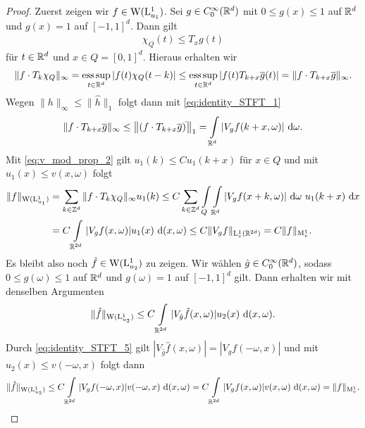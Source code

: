 \begin{proof}
	Zuerst zeigen wir $ f \in \mathrm{W}(\mathrm{L}^1_{u_1}) $.
	Sei $ g \in C^\infty_0(\mathbb{R}^d) $ mit $ 0 \leq g(x) \leq 1 $ auf $ \mathbb{R}^d $ und $ g(x) = 1  $ auf $ [-1,1]^d $. Dann gilt 
	\begin{align*}
	\chi_Q(t) \leq T_x g(t)
	\end{align*}
	für $ t \in \mathbb{R}^d $ und $ x \in Q = [0,1]^d $. 
	Hieraus erhalten wir
	\begin{align*}
	\| f \cdot T_k \chi_Q \|_\infty
	=
	\operatorname*{ess\,sup}_{t \in \mathbb{R}^d} | f(t) \chi_Q(t - k) |
	\leq 
	\operatorname*{ess\,sup}_{t \in \mathbb{R}^d} | f(t) T_{k+x} \overline{g}(t) |
	=
	\| f \cdot T_{k+x} \overline{g} \|_\infty.
	\end{align*}
	Wegen $ \| h \|_\infty \leq \| \hat{h} \|_1 $ folgt dann mit \eqref{eq:identity_STFT_1}
	\begin{align*}
	\| f \cdot T_{k+x} \overline{g} \|_\infty
	\leq
	\left\|(f \cdot T_{k+x} \overline{g})^{\hat{}} \right\|_1
	=
	\int \limits_{\mathbb{R}^d}
	| V_g f(k+x, \omega) | \text{ d} \omega.
	\end{align*}
	Mit \eqref{eq:v_mod_prop_2} gilt $ u_1(k) \leq C u_1(k+x) $ für $ x \in Q $ und mit $ u_1(x) \leq v(x,\omega) $ folgt 
	\begin{align*}
	\| f \|_{\mathrm{W}(\mathrm{L}^1_{u_1})} 
	&= 
	\sum \limits_{k \in \mathbb{Z}^d}
	\| f \cdot T_k\chi_Q \|_\infty u_1(k)
	\leq 
	C
	\sum \limits_{k \in \mathbb{Z}^d} 
	\int \limits_Q 
	\int \limits_{\mathbb{R}^d}
	| V_g f(x+ k, \omega) |  \text{ d} \omega  \ u_1(k + x) \text{ d} x\\
	&=
	C\int \limits_{\mathbb{R}^{2d}} |V_g f(x, \omega) | u_1(x) \text{ d} (x,\omega) 
	\leq C \| V_g f \|_{\mathrm{L}^1_v(\mathbb{R}^{2d})}
	= C \| f \|_{\mathrm{M}^1_v}.
	\end{align*}
	Es bleibt also noch $ \hat{f} \in \mathrm{W}(\mathrm{L}^1_{u_2}) $ zu zeigen.
	Wir wählen $ \hat{g} \in C^\infty_0(\mathbb{R}^d) $, sodass $ 0 \leq \hat{g}(\omega) \leq 1 $
	auf $ \mathbb{R}^d $ und $ g(\omega) = 1 $ auf $ [-1,1]^d $ gilt. 
	Dann erhalten wir mit denselben Argumenten
	\begin{align*}
	\| \hat{f} \|_{\mathrm{W}(\mathrm{L}^1_{u_2})}
	\leq 
	C 
	\int \limits_{\mathbb{R}^{2d}}
	| V_{\hat{g}} \hat{f}(x,\omega) | u_2(x) \text{ d} (x,\omega).
	\end{align*}
	Durch \eqref{eq:identity_STFT_5} gilt $ | V_{\hat{g}} \hat{f}(x,\omega) |
	= | V_g f (-\omega,x)|  $ und mit $ u_2(x) \leq v(-\omega,x) $ folgt dann
	\begin{align*}
	\| \hat{f} \|_{\mathrm{W}(\mathrm{L}^1_{u_2})}
	\leq 
	C \int \limits_{\mathbb{R}^{2d}}
	| V_g f(-\omega,x) | v(-\omega,x) \text{ d} (x,\omega)
	=
	C \int \limits_{\mathbb{R}^{2d}}
	| V_g f(x,\omega) | v(x,\omega) \text{ d} (x,\omega)
	= \| f \|_{\mathrm{M}^1_v}.
	\end{align*}
	\end{proof}
	
